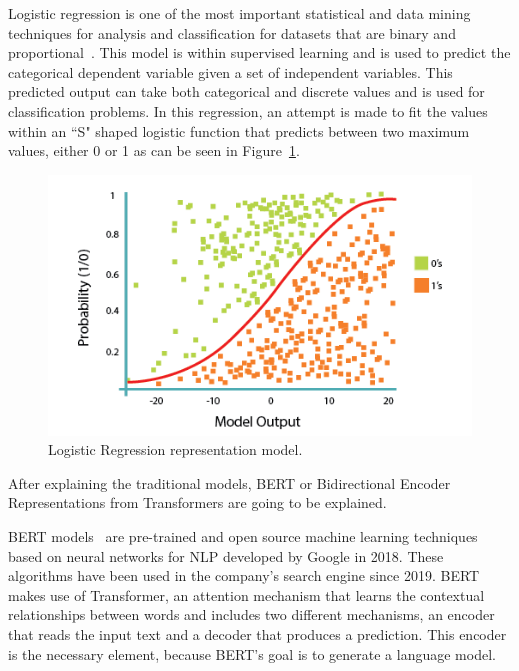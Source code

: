 Logistic regression is one of the most important statistical and data mining techniques for analysis and classification for datasets that are binary and proportional~\cite{maalouf2011logistic}. This model is within supervised learning and is used to predict the categorical dependent variable given a set of independent variables. This predicted output can take both categorical and discrete values and is used for classification problems. In this regression, an attempt is made to fit the values within an ``S" shaped logistic function that predicts between two maximum values, either 0 or 1 as can be seen in Figure~\ref{fig:LogisticRegression}.

\begin{figure}[!htp]
    \centering
    \includegraphics[scale=0.6]{img/detection/LogisticRegression.png}
    \caption{Logistic Regression representation model.}
    \label{fig:LogisticRegression}
\end{figure}




After explaining the traditional models, BERT or Bidirectional Encoder Representations from Transformers are going to be explained. 

BERT models~\cite{acheampong2021transformer} are pre-trained and open source machine learning techniques based on neural networks for NLP developed by Google in 2018. These algorithms have been used in the company's search engine since 2019. BERT makes use of Transformer, an attention mechanism that learns the contextual relationships between words and includes two different mechanisms, an encoder that reads the input text and a decoder that produces a prediction. This encoder is the necessary element, because BERT's goal is to generate a language model.

